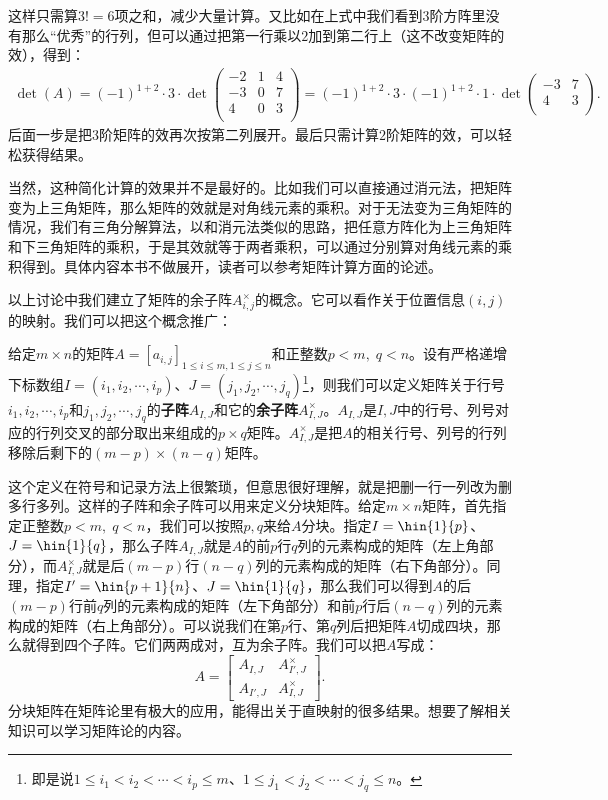 \documentclass[12pt,UTF8,fontset=none]{ctexbook}
\begin{document}
这样只需算$3! = 6$项之和，减少大量计算。又比如在上式中我们看到$3$阶方阵里没有那么“优秀”的行列，但可以通过把第一行乘以$2$加到第二行上（这不改变矩阵的效），得到：
\begin{align*}
    \det(A) = (-1)^{1+2} \cdot 3\cdot \det\begin{pmatrix}
        -2      & 1 & 4 \\
        -3       & 0 & 7  \\
        4       & 0 & 3 \\
       \end{pmatrix} = (-1)^{1+2} \cdot 3\cdot (-1)^{1+2} \cdot 1\cdot \det\begin{pmatrix}
        -3  & 7  \\
        4   & 3 \\
       \end{pmatrix}.
\end{align*}
后面一步是把$3$阶矩阵的效再次按第二列展开。最后只需计算$2$阶矩阵的效，可以轻松获得结果。

当然，这种简化计算的效果并不是最好的。比如我们可以直接通过消元法，把矩阵变为上三角矩阵，那么矩阵的效就是对角线元素的乘积。对于无法变为三角矩阵的情况，我们有三角分解算法，以和消元法类似的思路，把任意方阵化为上三角矩阵和下三角矩阵的乘积，于是其效就等于两者乘积，可以通过分别算对角线元素的乘积得到。具体内容本书不做展开，读者可以参考矩阵计算方面的论述。

以上讨论中我们建立了矩阵的余子阵$A_{i,j}^{\times}$的概念。它可以看作关于位置信息$(i,j)$的映射。我们可以把这个概念推广：
\begin{df}
    给定$m\times n$的矩阵$A = [a_{i,j}]_{1\leqslant i\leqslant m,1\leqslant j\leqslant n}$和正整数$p< m, \;q< n$。设有严格递增下标数组$I=(i_1,i_2,\cdots,i_p)$、$J=(j_1,j_2,\cdots,j_q)$\footnote{即是说$1\leqslant i_1<i_2<\cdots<i_p\leqslant m$、$1\leqslant j_1<j_2<\cdots<j_q\leqslant n$。}，则我们可以定义矩阵关于行号$i_1,i_2,\cdots,i_p$和$j_1,j_2,\cdots,j_q$的\textbf{子阵}$A_{I,J}$和它的\textbf{余子阵}$A_{I,J}^{\times}$。$A_{I,J}$是$I,J$中的行号、列号对应的行列交叉的部分取出来组成的$p\times q$矩阵。$A_{I,J}^{\times}$是把$A$的相关行号、列号的行列移除后剩下的$(m-p)\times(n-q)$矩阵。
\end{df}
这个定义在符号和记录方法上很繁琐，但意思很好理解，就是把删一行一列改为删多行多列。这样的子阵和余子阵可以用来定义分块矩阵。给定$m\times n$矩阵，首先指定正整数$p< m, \;q< n$，我们可以按照$p,q$来给$A$分块。指定$I=\hin{1}{p}$、$J=\hin{1}{q}$，那么子阵$A_{I,J}$就是$A$的前$p$行$q$列的元素构成的矩阵（左上角部分），而$A_{I,J}^{\times}$就是后$(m-p)$行$(n-q)$列的元素构成的矩阵（右下角部分）。同理，指定$I'=\hin{p+1}{n}$、$J=\hin{1}{q}$，那么我们可以得到$A$的后$(m-p)$行前$q$列的元素构成的矩阵（左下角部分）和前$p$行后$(n-q)$列的元素构成的矩阵（右上角部分）。可以说我们在第$p$行、第$q$列后把矩阵$A$切成四块，那么就得到四个子阵。它们两两成对，互为余子阵。我们可以把$A$写成：
$$
A = \begin{bmatrix}
    A_{I,J} & A_{I',J}^{\times} \\ A_{I',J} &  A_{I,J}^{\times}
\end{bmatrix}.
$$
分块矩阵在矩阵论里有极大的应用，能得出关于直映射的很多结果。想要了解相关知识可以学习矩阵论的内容。
\end{document}

